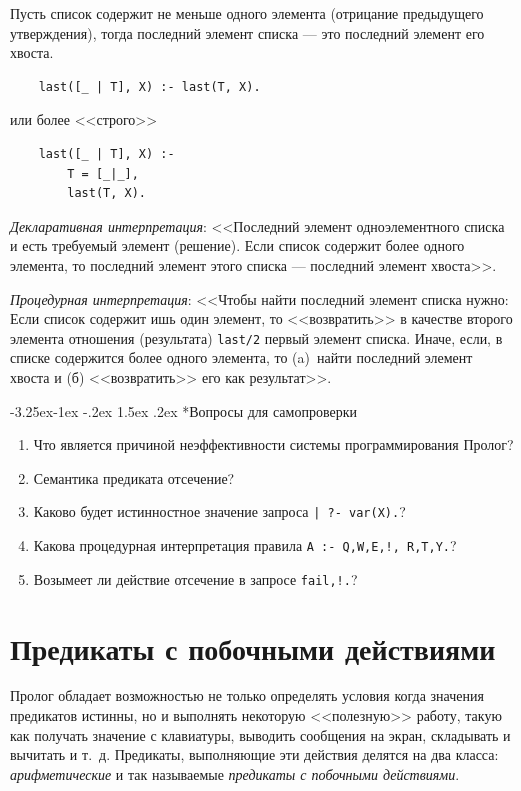 \documentclass[12pt, openany, twoside]{book} %
\makeatletter
\renewcommand\subsubsection{\@startsection{subsubsection}{3}{\z@}%
                                     {-3.25ex\@plus -1ex \@minus -.2ex}%
                                     {1.5ex \@plus .2ex}%
                                     {\normalfont\normalsize\bfseries}}
\newenvironment{questions}{\subsubsection*{Вопросы для самопроверки}\begin{enumerate}}{\end{enumerate}}
\makeatother
\begin{document}
Пусть список содержит не меньше одного элемента (отрицание предыдущего утверждения), тогда последний элемент списка --- это последний элемент его хвоста.

{\tt\begin{verbatim}
    last([_ | T], X) :- last(T, X).
\end{verbatim}}
\noindent или более <<строго>>
{\tt\begin{verbatim}
    last([_ | T], X) :-
        T = [_|_],
        last(T, X).
\end{verbatim}}\emph{Декларативная интерпретация}: <<Последний элемент одноэлементного списка и есть требуемый элемент (решение). Если список содержит более одного элемента, то последний элемент этого списка --- последний элемент хвоста>>.

\emph{Процедурная интерпретация}: <<Чтобы найти последний элемент списка нужно: Если список содержит ишь один элемент, то <<возвратить>> в качестве второго элемента отношения (результата) {\tt last/2} первый элемент списка. Иначе, если, в списке содержится более одного элемента, то (a)~найти последний элемент хвоста и (б) <<возвратить>> его как результат>>.

\begin{questions}
\item{} Что является причиной неэффективности системы программирования Пролог?
\item{} Семантика предиката отсечение?
\item{} Каково будет истинностное значение запроса \texttt{| ?- var(X).}?
\item{} Какова процедурная интерпретация правила \texttt{A :- Q,W,E,!, R,T,Y.}?
\item{} Возымеет ли действие отсечение в запросе \texttt{fail,!.}?
\end{questions}

\chapter{Предикаты с побочными действиями}
Пролог обладает возможностью не только определять условия когда значения предикатов истинны, но и выполнять некоторую <<полезную>> работу, такую как получать значение с клавиатуры, выводить сообщения на экран, складывать и вычитать и т.~д. Предикаты, выполняющие эти действия делятся на два класса: {\em арифметические} и так называемые {\em предикаты с побочными действиями}.
\end{document}
